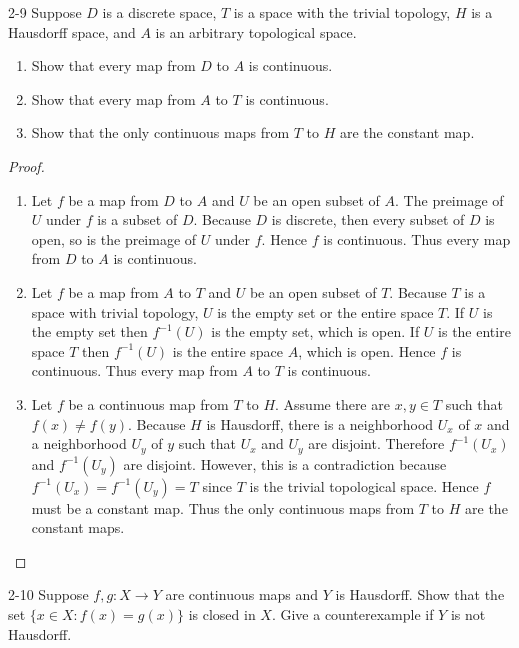 \begin{problem}{2-9}\label{problem:2-9}
Suppose $D$ is a discrete space, $T$ is a space with the trivial topology, $H$ is a Hausdorff space, and $A$ is an arbitrary topological space.
\begin{enumerate}[label={(\alph*)}]
	\item Show that every map from $D$ to $A$ is continuous.
	\item Show that every map from $A$ to $T$ is continuous.
	\item Show that the only continuous maps from $T$ to $H$ are the constant map.
\end{enumerate}
\end{problem}

\begin{proof}
	\begin{enumerate}[label={(\alph*)}]
		\item Let $f$ be a map from $D$ to $A$ and $U$ be an open subset of $A$. The preimage of $U$ under $f$ is a subset of $D$. Because $D$ is discrete, then every subset of $D$ is open, so is the preimage of $U$ under $f$. Hence $f$ is continuous. Thus every map from $D$ to $A$ is continuous.
		\item Let $f$ be a map from $A$ to $T$ and $U$ be an open subset of $T$. Because $T$ is a space with trivial topology, $U$ is the empty set or the entire space $T$. If $U$ is the empty set then $f^{-1}(U)$ is the empty set, which is open. If $U$ is the entire space $T$ then $f^{-1}(U)$ is the entire space $A$, which is open. Hence $f$ is continuous. Thus every map from $A$ to $T$ is continuous.
		\item Let $f$ be a continuous map from $T$ to $H$. Assume there are $x, y\in T$ such that $f(x)\ne f(y)$. Because $H$ is Hausdorff, there is a neighborhood $U_{x}$ of $x$ and a neighborhood $U_{y}$ of $y$ such that $U_{x}$ and $U_{y}$ are disjoint. Therefore $f^{-1}(U_{x})$ and $f^{-1}(U_{y})$ are disjoint. However, this is a contradiction because $f^{-1}(U_{x}) = f^{-1}(U_{y}) = T$ since $T$ is the trivial topological space. Hence $f$ must be a constant map. Thus the only continuous maps from $T$ to $H$ are the constant maps.
	\end{enumerate}
\end{proof}

\begin{problem}{2-10}
Suppose $f, g: X\to Y$ are continuous maps and $Y$ is Hausdorff. Show that the set $\{ x\in X : f(x) = g(x) \}$ is closed in $X$. Give a counterexample if $Y$ is not Hausdorff.
\end{problem}

